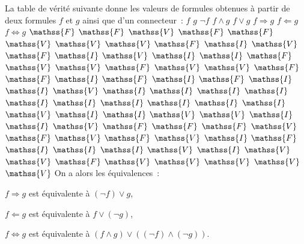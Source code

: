La table de vérité suivante donne les valeurs de formules obtenues à partir de deux formules $f$ et $g$ ainsi que d'un connecteur :
\startplacetable[location=force,number=no]
  \bTABLE[setups=fTable]
    \bTR\bTD $f$          \eTD\bTD $g$          \eTD\bTD $\lnot f$     \eTD\bTD $f \wedge g$ \eTD\bTD $f \vee g$   \eTD\bTD $f \Rightarrow g$ \eTD\bTD $f \Leftarrow g$ \eTD\bTD $f \Leftrightarrow g$ \eTD\eTR
    \bTR\bTD $\mathss{F}$ \eTD\bTD $\mathss{F}$ \eTD\bTD $\mathss{V}$ \eTD\bTD $\mathss{F}$ \eTD\bTD $\mathss{F}$ \eTD\bTD $\mathss{V}$      \eTD\bTD $\mathss{V}$     \eTD\bTD $\mathss{V}$          \eTD\eTR
    \bTR\bTD $\mathss{F}$ \eTD\bTD $\mathss{I}$ \eTD\bTD $\mathss{V}$ \eTD\bTD $\mathss{F}$ \eTD\bTD $\mathss{I}$ \eTD\bTD $\mathss{V}$      \eTD\bTD $\mathss{I}$     \eTD\bTD $\mathss{I}$          \eTD\eTR
    \bTR\bTD $\mathss{F}$ \eTD\bTD $\mathss{V}$ \eTD\bTD $\mathss{V}$ \eTD\bTD $\mathss{F}$ \eTD\bTD $\mathss{V}$ \eTD\bTD $\mathss{V}$      \eTD\bTD $\mathss{F}$     \eTD\bTD $\mathss{F}$          \eTD\eTR
    \bTR\bTD $\mathss{I}$ \eTD\bTD $\mathss{F}$ \eTD\bTD $\mathss{I}$ \eTD\bTD $\mathss{F}$ \eTD\bTD $\mathss{I}$ \eTD\bTD $\mathss{I}$      \eTD\bTD $\mathss{V}$     \eTD\bTD $\mathss{I}$          \eTD\eTR
    \bTR\bTD $\mathss{I}$ \eTD\bTD $\mathss{I}$ \eTD\bTD $\mathss{I}$ \eTD\bTD $\mathss{I}$ \eTD\bTD $\mathss{I}$ \eTD\bTD $\mathss{I}$      \eTD\bTD $\mathss{I}$     \eTD\bTD $\mathss{I}$          \eTD\eTR
    \bTR\bTD $\mathss{I}$ \eTD\bTD $\mathss{V}$ \eTD\bTD $\mathss{I}$ \eTD\bTD $\mathss{I}$ \eTD\bTD $\mathss{V}$ \eTD\bTD $\mathss{V}$      \eTD\bTD $\mathss{I}$     \eTD\bTD $\mathss{I}$          \eTD\eTR
    \bTR\bTD $\mathss{V}$ \eTD\bTD $\mathss{F}$ \eTD\bTD $\mathss{F}$ \eTD\bTD $\mathss{F}$ \eTD\bTD $\mathss{V}$ \eTD\bTD $\mathss{F}$      \eTD\bTD $\mathss{V}$     \eTD\bTD $\mathss{F}$          \eTD\eTR
    \bTR\bTD $\mathss{V}$ \eTD\bTD $\mathss{I}$ \eTD\bTD $\mathss{F}$ \eTD\bTD $\mathss{I}$ \eTD\bTD $\mathss{I}$ \eTD\bTD $\mathss{I}$      \eTD\bTD $\mathss{V}$     \eTD\bTD $\mathss{I}$          \eTD\eTR
    \bTR\bTD $\mathss{V}$ \eTD\bTD $\mathss{V}$ \eTD\bTD $\mathss{F}$ \eTD\bTD $\mathss{V}$ \eTD\bTD $\mathss{V}$ \eTD\bTD $\mathss{V}$      \eTD\bTD $\mathss{V}$     \eTD\bTD $\mathss{V}$          \eTD\eTR
  \eTABLE
\stopplacetable
On a alors les équivalences : 
\startitemize[nowhite]
  \item $f \Rightarrow g$ est équivalente à $(\lnot f) \vee g$,
  \item $f \Leftarrow g$ est équivalente à $f \vee (\lnot g)$,
  \item $f \Leftrightarrow g$ est équivalente à $(f \wedge g) \vee ((\lnot f) \wedge (\lnot g))$.
